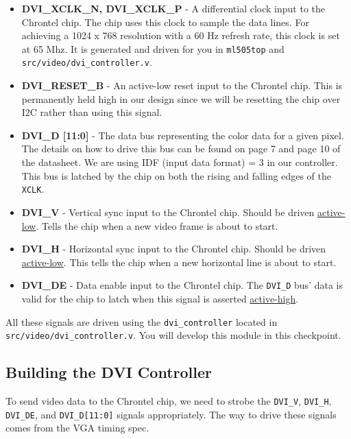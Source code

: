 \documentclass[11pt]{article}
\begin{document}
\begin{itemize}
	\item \textbf{DVI\_XCLK\_N, DVI\_XCLK\_P} - A differential clock input to the Chrontel chip. The chip uses this clock to sample the data lines. For achieving a 1024 x 768 resolution with a 60 Hz refresh rate, this clock is set at 65 Mhz. It is generated and driven for you in \verb|ml505top| and \verb|src/video/dvi_controller.v|.
	
	\item \textbf{DVI\_RESET\_B} - An active-low reset input to the Chrontel chip. This is permanently held high in our design since we will be resetting the chip over I2C rather than using this signal.
	
	\item \textbf{DVI\_D [11:0]} - The data bus representing the color data for a given pixel. The details on how to drive this bus can be found on page 7 and page 10 of the datasheet. We are using IDF (input data format) = 3 in our controller. This bus is latched by the chip on both the rising and falling edges of the \verb|XCLK|.
	
	\item \textbf{DVI\_V} - Vertical sync input to the Chrontel chip. Should be driven \underline{active-low}. Tells the chip when a new video frame is about to start.
	
	\item \textbf{DVI\_H} - Horizontal sync input to the Chrontel chip. Should be driven \underline{active-low}. This tells the chip when a new horizontal line is about to start.
	
	\item \textbf{DVI\_DE} - Data enable input to the Chrontel chip. The \verb|DVI_D| bus' data is valid for the chip to latch when this signal is asserted \underline{active-high}.
\end{itemize}

All these signals are driven using the \verb|dvi_controller| located in \verb|src/video/dvi_controller.v|. You will develop this module in this checkpoint.

\subsection{Building the DVI Controller}
To send video data to the Chrontel chip, we need to strobe the \verb|DVI_V|, \verb|DVI_H|, \verb|DVI_DE|, and \verb|DVI_D[11:0]| signals appropriately. The way to drive these signals comes from the VGA timing spec.
\end{document}
